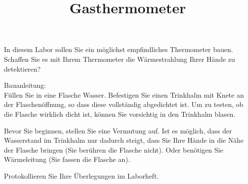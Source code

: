 \documentclass[12pt,a5paper, twosite]{article}
\author{}
\date{}
\title{Gasthermometer}
\begin{document}
\maketitle

In diesem Labor sollen Sie ein möglichst empfindliches Thermometer bauen.
Schaffen Sie es mit Ihrem Thermometer die Wärmestrahlung Ihrer Hände zu detektieren?

Bauanleitung:\\
Füllen Sie in eine Flasche Wasser. 
Befestigen Sie einen Trinkhalm mit Knete an der Flaschenöffnung, so dass diese vollständig abgedichtet ist.
Um zu testen, ob die Flasche wirklich dicht ist, können Sie vorsichtig in den Trinkhalm blasen.


Bevor Sie beginnen, stellen Sie eine Vermutung auf. 
Ist es möglich, dass der Wasserstand im Trinkhalm nur dadurch steigt, dass Sie Ihre Hände in die Nähe der Flasche bringen (Sie berühren die Flasche nicht).
Oder benötigen Sie Wärmeleitung (Sie fassen die Flasche an).

Protokollieren Sie Ihre Überlegungen im Laborheft.
\end{document}
